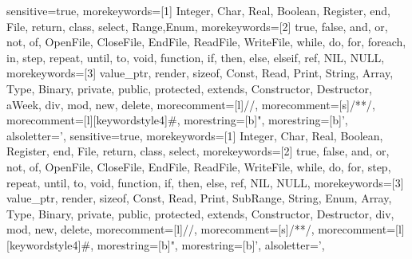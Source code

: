 \renewcommand{\lstlistingname}{C\'{o}digo}
{
sensitive=true,
morekeywords=[1]{
Integer, Char, Real, Boolean, Register, end, File, return, class, select, Range,Enum},
morekeywords=[2]{
true, false, and, or, not, of, OpenFile, CloseFile, EndFile, ReadFile, WriteFile, while, do, for, foreach, in, step, repeat, until, to, void, function, if, then, else, elseif, ref, NIL, NULL},
morekeywords=[3]{
value_ptr, render, sizeof, Const, Read, Print, String, Array, Type, Binary, private, public, protected, extends, Constructor, Destructor, aWeek, div, mod, new, delete},
morecomment=[l]{//},
morecomment=[s]{/*}{*/},
morecomment=[l][keywordstyle4]{\#},
morestring=[b]",
morestring=[b]',
alsoletter={'},
}
{
sensitive=true,
morekeywords=[1]{
Integer, Char, Real, Boolean, Register, end, File, return, class, select},
morekeywords=[2]{
true, false, and, or, not, of, OpenFile, CloseFile, EndFile, ReadFile, WriteFile, while, do, for, step, repeat, until, to, void, function, if, then, else, ref, NIL, NULL},
morekeywords=[3]{
value_ptr, render, sizeof, Const, Read, Print, SubRange, String, Enum, Array, Type, Binary, private, public, protected, extends, Constructor, Destructor, div, mod, new, delete},
morecomment=[l]{//},
morecomment=[s]{/*}{*/},
morecomment=[l][keywordstyle4]{\#},
morestring=[b]",
morestring=[b]',
alsoletter={'},
}
